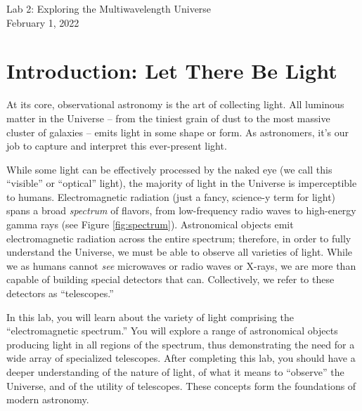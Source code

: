 \documentclass[11pt]{article}
\begin{document}
\begin{center}
\huge{Lab 2: Exploring the Multiwavelength Universe}\\ \medskip \Large{February 1, 2022}
\end{center}

\section{Introduction: Let There Be Light}
At its core, observational astronomy is the art of collecting light. All luminous matter in the Universe -- from the tiniest grain of dust to the most massive cluster of galaxies -- emits light in some shape or form. As astronomers, it's our job to capture and interpret this ever-present light. 

While some light can be effectively processed by the naked eye (we call this ``visible'' or ``optical'' light), the majority of light in the Universe is imperceptible to humans. Electromagnetic radiation (just a fancy, science-y term for light) spans a broad \emph{spectrum} of flavors, from low-frequency radio waves to high-energy gamma rays (see Figure \ref{fig:spectrum}). Astronomical objects emit electromagnetic radiation across the entire spectrum; therefore, in order to fully understand the Universe, we must be able to observe all varieties of light. While we as humans cannot \emph{see} microwaves or radio waves or X-rays, we are more than capable of building special detectors that can. Collectively, we refer to these detectors as ``telescopes.''

In this lab, you will learn about the variety of light comprising the ``electromagnetic spectrum.'' You will explore a range of astronomical objects producing light in all regions of the spectrum, thus demonstrating the need for a wide array of specialized telescopes. After completing this lab, you should have a deeper understanding of the nature of light, of what it means to ``observe'' the Universe, and of the utility of telescopes. These concepts form the foundations of modern astronomy. 

\bigskip
\end{document}
